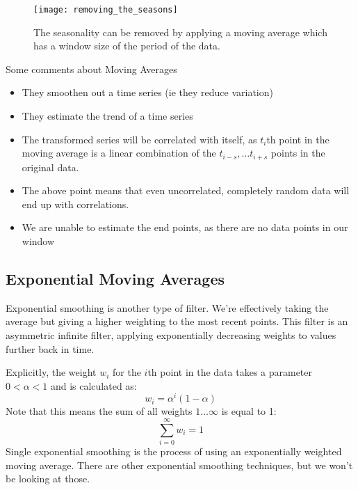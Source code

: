     \begin{figure}[t]
        \centering
        \texttt{[image: removing\_the\_seasons]}
        \caption{The seasonality can be removed by applying a moving average
        which has a window size of the period of the data.}
        \label{fig:removing_the_seasons}
    \end{figure}


    Some comments about Moving Averages
    \begin{itemize} 
        \item They smoothen out a time series (ie they reduce variation) 
        \item They estimate the trend of a time series 
        \item The transformed series will be correlated with itself, as $t_i$th
            point in the moving average is a linear combination of the
            $t_{i-s}, \dots t_{i+s}$ points in the original data.  
        \item The above point means that even uncorrelated, completely random
            data will end up with correlations.  
        \item We are unable to estimate the end points, as there are no data
            points in our window
    \end{itemize} 


    \subsection{Exponential Moving Averages}
    Exponential smoothing is another type of filter. We're effectively taking
    the average but giving a higher weighting to the most recent points.  This
    filter is an asymmetric infinite filter, applying exponentially decreasing
    weights to values further back in time.

    Explicitly, the weight $w_i$ for the $i$th point in the data takes a
    parameter $0 < \alpha < 1$ and is calculated as:
    \[
        w_i = \alpha^i (1 - \alpha)
    \]
    Note that this means the sum of all weights $1 \dots \infty$ is equal to 1:
    \[
        \sum_{i=0}^\infty w_i = 1
    \]
    Single exponential smoothing is the process of using an exponentially
    weighted moving average. There are other exponential smoothing techniques,
    but we won't be looking at those.

